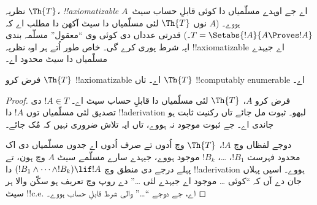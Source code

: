 \documentclass[../../../include/open-logic-section]{subfiles}
\begin{document}


نظریہ $\Th{T}$، \emph{!!{axiomatizable}} اے جے اوہدے
مسلّمیاں دا کوئی قابلِ حساب سیٹ~$A$ ہووے۔ ($A$ نوں $\Th{T}$ لئی
مسلّمیاں دا سیٹ آکھن دا مطلب اے کہ $T = \Setabs{!A}{A \Proves !A}$۔)
قدرتی عدداں دی کوئی وی “معقول” مسلّمہ بندی ایہ شرط پوری کرے گی۔
خاص طور اُتے ہر اوہ نظریہ !!{axiomatizable} اے جیہدے مسلّمیاں
دا سیٹ محدود اے۔

\begin{lem}
فرض کرو $\Th{T}$ !!{axiomatizable} اے۔ تاں $\Th{T}$
!!{computably
enumerable} اے۔
\end{lem}

\begin{proof}
فرض کرو $A$، $\Th{T}$ لئی مسلّمیاں دا قابلِ حساب سیٹ اے۔
$!A \in T$ دی تصدیق لئی مسلّمیاں توں $!A$ دا !!a{derivation}
لبھو۔ ثبوت مل جائے تاں رکنیت ثابت ہو جاندی اے۔ جے ثبوت موجود
نہ ہووے، تاں ایہ تلاش ضروری نہیں کہ مُک جائے۔

دوجے لفظاں وچ $!A$، $\Th{T}$ وچ اُدوں تے صرف اُدوں اے
جدوں مسلّمیاں دی اک محدود فہرست $!B_1$، \dots، $!B_k$
موجود ہووے، جیہدے سارے مسلّمے سیٹ $A$ وچ ہون، تے پہلے درجے
دی منطق وچ $(!B_1 \land \dots \land !B_k) \lif !A$ دا
!!a{derivation} ہووے۔ اسیں پہلاں جان دے آں کہ “کوئی \dots
موجود اے جیہدے لئی \dots” دے روپ وچ تعریف ہو سکّن والا ہر
سیٹ !!{c.e.} اے، جے دوجے “\dots” والی شرط قابلِ حساب ہووے۔
\end{proof}
\end{document}

